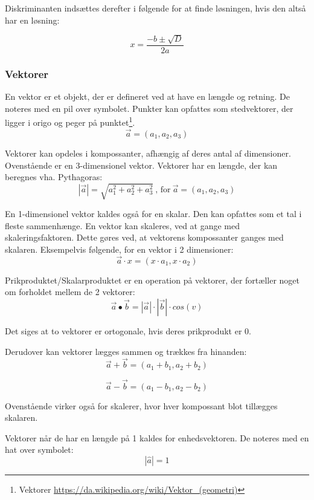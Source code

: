 \documentclass{article}
\begin{document}
\begin{flushleft}
    Diskriminanten indsættes derefter i følgende for at finde løsningen, hvis den altså har en løsning:

    \[x = \frac{-b \pm \sqrt{D}}{2a}\]

    \subsubsection{Vektorer}

    En vektor er et objekt, der er defineret ved at have en længde og retning.
    De noteres med en pil over symbolet. Punkter kan opfattes som stedvektorer,
    der ligger i origo og peger på punktet\footnote{Vektorer \url{https://da.wikipedia.org/wiki/Vektor_(geometri)}}.
    \[\vec{a} = (a_1, a_2, a_3) \]

    Vektorer kan opdeles i kompossanter, afhængig af deres antal af dimensioner.
    Ovenstående er en 3-dimensionel vektor.
    Vektorer har en længde, der kan beregnes vha. Pythagoras:
    \[|\vec{a}| = \sqrt{a_1^2+a_2^2+a_3^2} \ \textrm{, for} \ \vec{a} = (a_1, a_2, a_3) \]

    En 1-dimensionel vektor kaldes også for en skalar. Den kan opfattes som et tal i fleste sammenhænge.
    En vektor kan skaleres, ved at gange med skaleringsfaktoren.
    Dette gøres ved, at vektorens kompossanter ganges med skalaren.
    Eksempelvis følgende, for en vektor i 2 dimensioner:
    \[\vec{a} \cdot x = (x \cdot a_1, x \cdot a_2)\]

    Prikproduktet/Skalarproduktet er en operation på vektorer,
    der fortæller noget om forholdet mellem de 2 vektorer:
    \[\vec{a} \bullet \vec{b} = |\vec{a}| \cdot |\vec{b}| \cdot cos(v)\]

    Det siges at to vektorer er ortogonale, hvis deres prikprodukt er 0.

    Derudover kan vektorer lægges sammen og trækkes fra hinanden:
    \begin{equation}
        \vec{a} + \vec{b} = (a_1+b_1, a_2+b_2)
    \end{equation}

    \begin{equation}
        \vec{a} - \vec{b} = (a_1-b_1, a_2-b_2)
    \end{equation}

    Ovenstående virker også for skalerer, hvor hver kompossant blot tillægges skalaren.

    Vektorer når de har en længde på 1 kaldes for enhedsvektoren.
    De noteres med en hat over symbolet:
    \[|\hat{a}|=1 \]


\end{flushleft}
\end{document}
